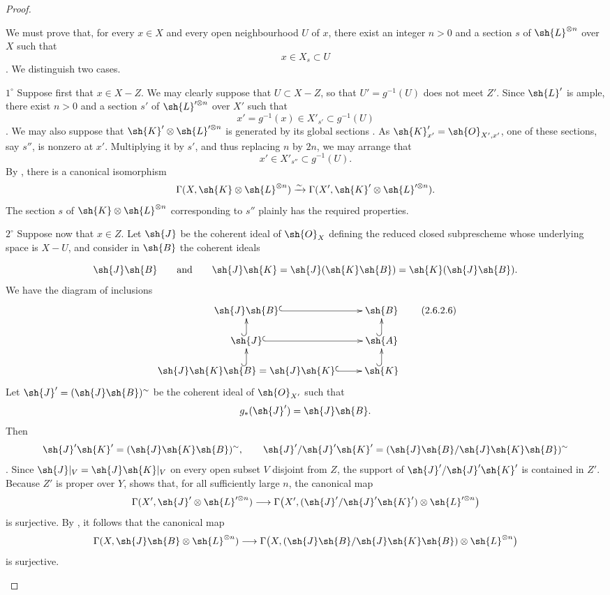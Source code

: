 \begin{proof}
\begin{env}[2.6.2.5]
We must prove that, for every $x\in X$ and every open neighbourhood $U$
of $x$, there exist an integer $n>0$ and a section $s$ of
$\sh{L}^{\otimes n}$ over $X$ such that
\[
  x\in X_s\subset U
\]
.
We distinguish two cases.

\smallskip
\noindent
$1^\circ$ Suppose first that $x\in X-Z$.
We may clearly suppose that $U\subset X-Z$, so that
$U'=g^{-1}(U)$ does not meet $Z'$.
Since $\sh{L}'$ is ample, there exist $n>0$ and a section $s'$ of
$\sh{L}'^{\otimes n}$ over $X'$ such that
\[
  x'=g^{-1}(x)\in X'_{s'}\subset g^{-1}(U)
\]
.
We may also suppose that
$\sh{K}'\otimes\sh{L}'^{\otimes n}$ is generated by its global sections
.
As $\sh{K}'_{x'}=\sh{O}_{X',x'}$, one of these sections, say $s''$, is
nonzero at $x'$.
Multiplying it by $s'$, and thus replacing $n$ by $2n$, we may arrange
that
\[
  x'\in X'_{s''}\subset g^{-1}(U).
\]
By , there is a canonical isomorphism
\[
  \Gamma(X,\sh{K}\otimes\sh{L}^{\otimes n})
  \xrightarrow{\sim}
  \Gamma(X',\sh{K}'\otimes\sh{L}'^{\otimes n}).
\]
The section $s$ of $\sh{K}\otimes\sh{L}^{\otimes n}$ corresponding to
$s''$ plainly has the required properties.

\smallskip
\noindent
$2^\circ$ Suppose now that $x\in Z$.
Let $\sh{J}$ be the coherent ideal of $\sh{O}_X$ defining the reduced
closed subprescheme whose underlying space is $X-U$, and consider in
$\sh{B}$ the coherent ideals


\[
  \sh{J}\sh{B}
  \qquad\text{and}\qquad
  \sh{J}\sh{K}
  =
  \sh{J}(\sh{K}\sh{B})
  =
  \sh{K}(\sh{J}\sh{B}).
\]
We have the diagram of inclusions
\[
  \xymatrix@R=1.5em{
    \sh{J}\sh{B}\ar@{^{(}->}[r] &
    \sh{B}\\
    \sh{J}\ar@{^{(}->}[r]\ar@{^{(}->}[u] &
    \sh{A}\ar@{^{(}->}[u]\\
    \sh{J}\sh{K}\sh{B}=\sh{J}\sh{K}
      \ar@{^{(}->}[r]\ar@{^{(}->}[u] &
    \sh{K}\ar@{^{(}->}[u]
  }
  \label{III.2.6.2.6}\tag{2.6.2.6}
\]
Let $\sh{J}'=(\sh{J}\sh{B})^\sim$ be the coherent ideal of
$\sh{O}_{X'}$ such that
\[
  g_*(\sh{J}')=\sh{J}\sh{B}.
\]
Then
\[
  \sh{J}'\sh{K}'=(\sh{J}\sh{K}\sh{B})^\sim,
  \qquad
  \sh{J}'/\sh{J}'\sh{K}'
  =
  (\sh{J}\sh{B}/\sh{J}\sh{K}\sh{B})^\sim
\]
.
Since $\sh{J}|_V=\sh{J}\sh{K}|_V$ on every open subset $V$ disjoint
from $Z$, the support of $\sh{J}'/\sh{J}'\sh{K}'$ is contained in
$Z'$.
Because $Z'$ is proper over $Y$,  shows that, for all
sufficiently large $n$, the canonical map
\[
  \Gamma(X',\sh{J}'\otimes\sh{L}'^{\otimes n})
  \longrightarrow
  \Gamma\bigl(
    X',
    (\sh{J}'/\sh{J}'\sh{K}')\otimes\sh{L}'^{\otimes n}
  \bigr)
\]
is surjective.
By , it follows that the canonical map
\[
  \Gamma(X,\sh{J}\sh{B}\otimes\sh{L}^{\otimes n})
  \longrightarrow
  \Gamma\bigl(
    X,
    (\sh{J}\sh{B}/\sh{J}\sh{K}\sh{B})
      \otimes\sh{L}^{\otimes n}
  \bigr)
\]
is surjective.


\end{env}
\end{proof}
